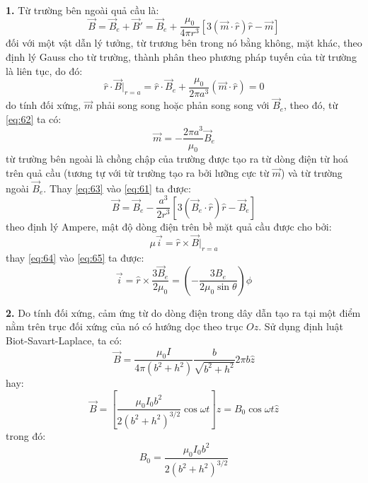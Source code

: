 \noindent\textbf{1.} Từ trường bên ngoài quả cầu là:
\begin{equation}
  \label{eq:61}
  \vec{B}=\vec{B}_{e}+\vec{B}'=\vec{B}_{e}+\frac{\mu_{0}}{4\pi r^{3}}\left[3(\vec{m}\cdot\hat{r})\hat{r}-\vec{m}\right]
\end{equation}
đối với một vật dẫn lý tưởng, từ trương bên trong nó bằng không, mặt khác, theo định lý Gauss cho từ trường, thành phân theo phương pháp tuyến của từ trường là liên tục, do đó:
\begin{equation}
  \label{eq:62}
  \hat{r}\cdot\vec{B}\vert_{r=a}=\hat{r}\cdot\vec{B}_{e}+\frac{\mu_{0}}{2\pi a^{3}}(\vec{m}\cdot\hat{r})=0
\end{equation}
do tính đối xứng, $\vec{m}$ phải song song hoặc phản song song với $\vec{B}_{e}$, theo đó, từ \eqref{eq:62} ta có:
\begin{equation}
  \label{eq:63}
  \vec{m}=-\frac{2\pi a^{3}}{\mu_{0}}\vec{B}_{e}
\end{equation}
từ trường  bên ngoài là chồng chập của trường được tạo ra từ dòng điện từ hoá trên quả cầu (tương tự với từ trường tạo ra bởi lưỡng cực từ $\vec{m}$) và từ trường ngoài $\vec{B}_{e}$. Thay \eqref{eq:63} vào \eqref{eq:61} ta được:
\begin{equation}
  \label{eq:64}
  \vec{B}=\vec{B}_{e}-\frac{a^{3}}{2r^{3}}\left[3(\vec{B}_{e}\cdot\hat{r})\hat{r}-\vec{B}_{e}\right]
\end{equation}
theo định lý Ampere, mật độ dòng điện trên bề mặt quả cầu được cho bởi:
\begin{equation}
  \label{eq:65}
  \mu\vec{i}=\hat{r}\times\vec{B}\vert_{r=a}
\end{equation}
thay \eqref{eq:64} vào \eqref{eq:65} ta được:
\begin{equation}
  \label{eq:66}
  \vec{i}=\hat{r}\times\frac{3\vec{B}_{e}}{2\mu_{0}}=\left(-\frac{3B_{e}}{2\mu_{0}\sin\theta}\right)\hat{\phi}
\end{equation}

\noindent\textbf{2.} Do tính đối xứng, cảm ứng từ do dòng điện trong dây dẫn tạo ra tại một điểm nằm trên trục đối xứng của nó có hướng dọc theo trục $Oz$. Sử dụng định luật Biot-Savart-Laplace, ta có:
\begin{equation*}
  \vec{B}=\frac{\mu_{0}I}{4\pi(b^{2}+h^{2})}\frac{b}{\sqrt{b^{2}+h^{2}}}2\pi b\hat{z}
\end{equation*}
hay:
\begin{equation}
  \label{eq:67}
  \vec{B}=\left[\frac{\mu_{0}I_{0}b^{2}}{2(b^{2}+h^{2})^{3/2}}\cos\omega t\right]\hat{z}=B_{0}\cos\omega t\hat{z}
\end{equation}
trong đó:
\begin{equation*}
  B_{0}=\frac{\mu_{0}I_{0}b^{2}}{2(b^{2}+h^{2})^{3/2}}
\end{equation*}

